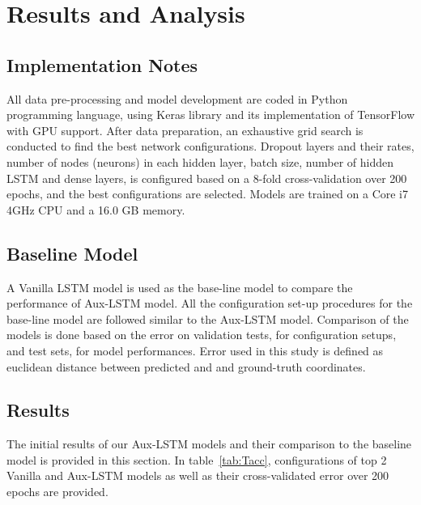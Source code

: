 \section{Results and Analysis}
\label{S:T5}
\subsection{Implementation Notes}
All data pre-processing and model development are coded in Python programming language, using Keras library and its implementation of TensorFlow with GPU support. After data preparation, an exhaustive grid search is conducted to find the best network configurations. Dropout layers and their rates, number of nodes (neurons) in each hidden layer, batch size, number of hidden LSTM and dense layers, is configured based on a 8-fold cross-validation over 200 epochs, and the best configurations are selected. Models are trained on a Core i7 4GHz CPU and a 16.0 GB memory.  
\subsection{Baseline Model}
A Vanilla LSTM model is used as the base-line model to compare the performance of Aux-LSTM model. All the configuration set-up procedures for the base-line model are followed similar to the Aux-LSTM model. Comparison of the models is done based on the error on validation tests, for configuration setups, and test sets, for model performances. Error used in this study is defined as euclidean distance between predicted and and ground-truth coordinates.  
\subsection{Results}
The initial results of our Aux-LSTM models and their comparison to the baseline model is provided in this section. In table~\ref{tab:Tacc}, configurations of top 2 Vanilla and Aux-LSTM models as well as their cross-validated error over 200 epochs are provided. 


